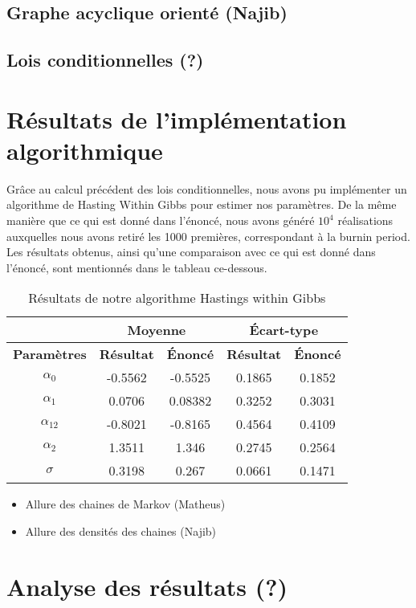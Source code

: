 \documentclass[
]{article}
\providecommand{\tightlist}{%
  \setlength{\itemsep}{0pt}\setlength{\parskip}{0pt}}
\begin{document}
\hypertarget{graphe-acyclique-orientuxe9-najib}{%
\subsection{Graphe acyclique orienté
(Najib)}\label{graphe-acyclique-orientuxe9-najib}}

\hypertarget{lois-conditionnelles}{%
\subsection{Lois conditionnelles (?)}\label{lois-conditionnelles}}

\hypertarget{ruxe9sultats-de-limpluxe9mentation-algorithmique}{%
\section{Résultats de l'implémentation
algorithmique}\label{ruxe9sultats-de-limpluxe9mentation-algorithmique}}

Grâce au calcul précédent des lois conditionnelles, nous avons pu
implémenter un algorithme de Hasting Within Gibbs pour estimer nos
paramètres. De la même manière que ce qui est donné dans l'énoncé, nous
avons généré \(10^4\) réalisations auxquelles nous avons retiré les 1000
premières, correspondant à la burnin period. Les résultats obtenus,
ainsi qu'une comparaison avec ce qui est donné dans l'énoncé, sont
mentionnés dans le tableau ce-dessous.

\begin{table}[h]
\centering
\small
\begin{minipage}{0.45\textwidth}
\centering
\begin{tabular}{|c|c|c|c|c|}
\hline
\multicolumn{1}{|c|}{} &
\multicolumn{2}{|c|}{\textbf{Moyenne}} & \multicolumn{2}{|c|}{\textbf{Écart-type}} \\
\hline
\textbf{Paramètres} & \textbf{Résultat} & \textbf{Énoncé} & \textbf{Résultat} & \textbf{Énoncé} \\
\hline
$\alpha_0$ & -0.5562 & -0.5525 & 0.1865 & 0.1852 \\
$\alpha_1$ & 0.0706 & 0.08382 & 0.3252 & 0.3031 \\
$\alpha_{12}$ & -0.8021 & -0.8165 & 0.4564 & 0.4109 \\
$\alpha_2$ & 1.3511 & 1.346 & 0.2745 & 0.2564 \\
$\sigma$ & 0.3198 & 0.267 & 0.0661 & 0.1471 \\
\hline
\end{tabular}
\caption{Résultats de notre algorithme Hastings within Gibbs}
\end{minipage}
\end{table}

\begin{itemize}
\tightlist
\item
  Allure des chaines de Markov (Matheus)
\item
  Allure des densités des chaines (Najib)
\end{itemize}

\hypertarget{analyse-des-ruxe9sultats}{%
\section{Analyse des résultats (?)}\label{analyse-des-ruxe9sultats}}
\end{document}
